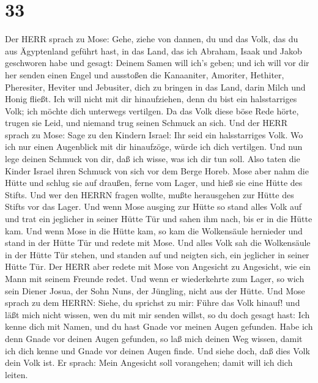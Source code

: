 \hypertarget{section-32}{%
\section{33}\label{section-32}}

 Der HERR sprach zu Mose: Gehe, ziehe von dannen, du und das
Volk, das du aus Ägyptenland geführt hast, in das Land, das ich Abraham,
Isaak und Jakob geschworen habe und gesagt: Deinem Samen will ich's
geben;  und ich will vor dir her senden einen Engel und
ausstoßen die Kanaaniter, Amoriter, Hethiter, Pheresiter, Heviter und
Jebusiter,  dich zu bringen in das Land, darin Milch und
Honig fließt. Ich will nicht mit dir hinaufziehen, denn du bist ein
halsstarriges Volk; ich möchte dich unterwegs vertilgen.  Da
das Volk diese böse Rede hörte, trugen sie Leid, und niemand trug seinen
Schmuck an sich.  Und der HERR sprach zu Mose: Sage zu den
Kindern Israel: Ihr seid ein halsstarriges Volk. Wo ich nur einen
Augenblick mit dir hinaufzöge, würde ich dich vertilgen. Und nun lege
deinen Schmuck von dir, daß ich wisse, was ich dir tun soll.
 Also taten die Kinder Israel ihren Schmuck von sich vor dem
Berge Horeb.  Mose aber nahm die Hütte und schlug sie auf
draußen, ferne vom Lager, und hieß sie eine Hütte des Stifts. Und wer
den HERRN fragen wollte, mußte herausgehen zur Hütte des Stifts vor das
Lager.  Und wenn Mose ausging zur Hütte so stand alles Volk
auf und trat ein jeglicher in seiner Hütte Tür und sahen ihm nach, bis
er in die Hütte kam.  Und wenn Mose in die Hütte kam, so kam
die Wolkensäule hernieder und stand in der Hütte Tür und redete mit
Mose.  Und alles Volk sah die Wolkensäule in der Hütte Tür
stehen, und standen auf und neigten sich, ein jeglicher in seiner Hütte
Tür.  Der HERR aber redete mit Mose von Angesicht zu
Angesicht, wie ein Mann mit seinem Freunde redet. Und wenn er
wiederkehrte zum Lager, so wich sein Diener Josua, der Sohn Nuns, der
Jüngling, nicht aus der Hütte.  Und Mose sprach zu dem
HERRN: Siehe, du sprichst zu mir: Führe das Volk hinauf! und läßt mich
nicht wissen, wen du mit mir senden willst, so du doch gesagt hast: Ich
kenne dich mit Namen, und du hast Gnade vor meinen Augen gefunden.
 Habe ich denn Gnade vor deinen Augen gefunden, so laß mich
deinen Weg wissen, damit ich dich kenne und Gnade vor deinen Augen
finde. Und siehe doch, daß dies Volk dein Volk ist.  Er
sprach: Mein Angesicht soll vorangehen; damit will ich dich leiten.
